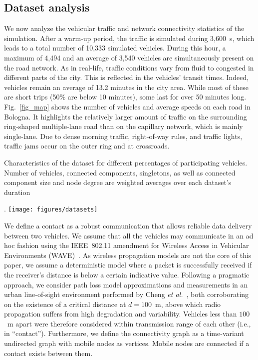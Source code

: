 \documentclass[preprint]{elsarticle}
\begin{document}
\subsection{Dataset analysis}
\label{subsec:dataset_analysis}

We now analyze the vehicular traffic and network connectivity statistics of the simulation. After a warm-up period, the traffic is simulated during 3,600~s, which leads to a total number of 10,333 simulated vehicles. During this hour, a maximum of 4,494 and an average of 3,540 vehicles are simultaneously present on the road network. As in real-life, traffic conditions vary from fluid to congested in different parts of the city. This is reflected in the vehicles' transit times. Indeed, vehicles remain an average of 13.2 minutes in the city area. While most of these are short trips (50\% are below 10 minutes), some last for over 50 minutes long. Fig.~\ref{fig_map} shows the number of vehicles and average speeds on each road in Bologna. It highlights the relatively larger amount of traffic on the surrounding ring-shaped multiple-lane road than on the capillary network, which is mainly single-lane. Due to dense morning traffic, right-of-way rules, and traffic lights, traffic jams occur on the outer ring and at crossroads.

\begin{table}
  \centering
  \caption{Characteristics of the dataset for different percentages of participating vehicles. Number of vehicles, connected components, singletons, as well as connected component size and node degree are weighted averages over each dataset's duration}.
  \texttt{[image: figures/datasets]}
  \label{table:dataset}
\end{table}

We define a contact as a robust communication that allows reliable data delivery between two vehicles. We assume that all the vehicles may communicate in an ad hoc fashion using the IEEE~802.11 amendment for Wireless Access in Vehicular Environments (WAVE)~\cite{80211p}. As wireless propagation models are not the core of this paper, we assume a deterministic model where a packet is successfully received if the receiver's distance is below a certain indicative value. Following a pragmatic approach, we consider path loss model approximations and measurements in an urban line-of-sight environment performed by Cheng \textit{et al.}~\cite{cheng2007mobile}, both corroborating on the existence of a critical distance at $d=100$~m, above which radio propagation suffers from high degradation and variability. Vehicles less than $100$~m apart were therefore considered within transmission range of each other (i.e., in ``contact''). Furthermore, we define the connectivity graph as a time-variant undirected graph with mobile nodes as vertices. Mobile nodes are connected if a contact exists between them.
\end{document}
